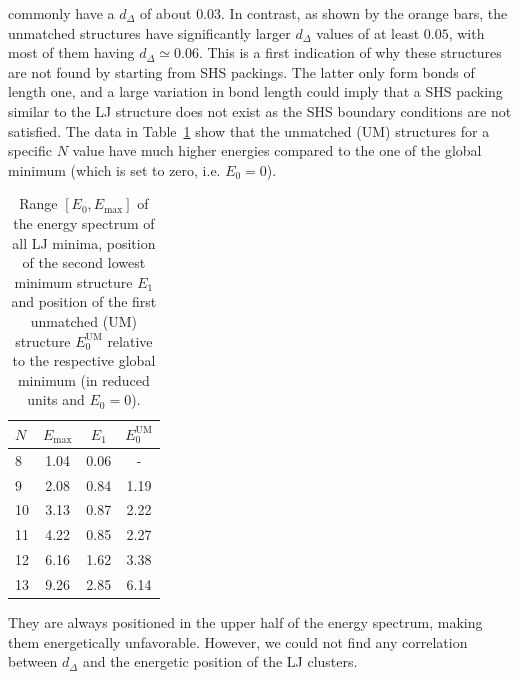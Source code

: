 commonly have a $d_\Delta$ of about $0.03$.  In contrast, as shown by the
orange bars, the unmatched structures have significantly larger $d_\Delta$
values of at least $0.05$, with most of them having $d_{\Delta} \simeq 0.06$.
This is a first indication of why these structures are not found by starting
from SHS packings. The latter only form bonds of length one, and a large
variation in bond length could imply that a SHS packing similar to the LJ
structure does not exist as the SHS boundary conditions are not satisfied.  The
data in Table~\ref{tab:energies} show that the unmatched (UM) structures for a
specific $N$ value have much higher energies compared to the one of the global
minimum (which is set to zero, i.e.  $E_0=0$). %
%
\begin{table}\centering
    \caption{Range $[E_0,E_\text{max}]$ of the energy spectrum of all LJ
    minima, position of the second lowest minimum structure $E_1$ and position
    of the first unmatched (UM) structure $E_0^\text{UM}$ relative to the
    respective global minimum (in reduced units and $E_0=0$).}
    \label{tab:energies}
        \begin{tabular}{lccc}\toprule
        $N$ & $E_\text{max}$ & $E_1$ & $E_0^\text{UM}$ \\\midrule
        8   & 1.04   & 0.06    & -           \\
        9   & 2.08   & 0.84    & 1.19        \\
        10  & 3.13   & 0.87    & 2.22        \\
        11  & 4.22   & 0.85    & 2.27        \\
        12  & 6.16   & 1.62    & 3.38        \\
        13  & 9.26   & 2.85    & 6.14        \\\bottomrule
        \end{tabular}
\end{table}%
%
They are always positioned in the upper half of the energy spectrum, making
them energetically unfavorable.  However, we could not find any correlation
between $d_\Delta$ and the energetic position of the LJ clusters.

